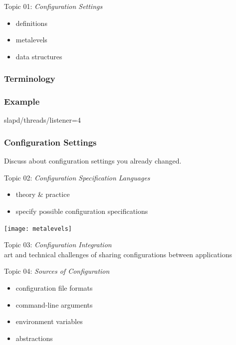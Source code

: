 \begin{frame}
	Topic 01: \textit{Configuration Settings}
	\begin{itemize}
		\item definitions
		\item metalevels
		\item data structures
	\end{itemize}
\end{frame}

\begin{frame}
	\frametitle{Terminology}
	
\end{frame}

\begin{frame}[fragile]
	\frametitle{Example}

	\begin{code}[language=CfgElektra]
	slapd/threads/listener=4
	\end{code}
\end{frame}

\begin{assignment}
	\frametitle{Configuration Settings}
	\begin{task}
	Discuss about configuration settings you already changed.
	\end{task}
\end{assignment}

\begin{frame}
	Topic 02: \textit{Configuration Specification Languages}
	\begin{itemize}
		\item theory \& practice
		\item specify possible configuration specifications
	\end{itemize}
	\vspace{0.5cm}
	\texttt{[image: metalevels]}
\end{frame}

\begin{frame}
	Topic 03: \textit{Configuration Integration}
	\\ \vspace{1cm}
	art and technical challenges of sharing configurations between applications
\end{frame}


\begin{frame}
	Topic 04: \textit{Sources of Configuration}
	\begin{itemize}
		\item configuration file formats
		\item command-line arguments
		\item environment variables
		\item abstractions
	\end{itemize}
\end{frame}

